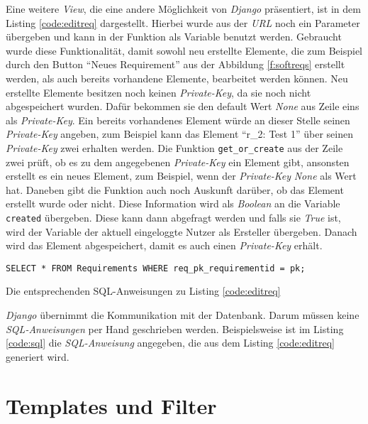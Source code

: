 \documentclass[11pt,a4paper]{report}
\begin{document}
Eine weitere \textit{View}, die eine andere Möglichkeit von \textit{Django} präsentiert, ist in dem Listing \ref{code:editreq} dargestellt. Hierbei wurde aus der \textit{URL} noch ein Parameter übergeben und kann in der Funktion als Variable benutzt werden. Gebraucht wurde diese Funktionalität, damit sowohl neu erstellte Elemente, die zum Beispiel durch den Button "`Neues Requirement"' aus der Abbildung \ref{f:softreqs} erstellt werden, als auch bereits vorhandene Elemente, bearbeitet werden können. Neu erstellte Elemente besitzen noch keinen \textit{Private-Key}, da sie noch nicht abgespeichert wurden. Dafür bekommen sie den default Wert \textit{None} aus Zeile eins als \textit{Private-Key}. Ein bereits vorhandenes Element würde an dieser Stelle seinen \textit{Private-Key} angeben, zum Beispiel kann das Element "`r\_2: Test 1"' über seinen \textit{Private-Key} zwei erhalten werden. Die Funktion \verb|get_or_create| aus der Zeile zwei prüft, ob es zu dem angegebenen \textit{Private-Key} ein Element gibt, ansonsten erstellt es ein neues Element, zum Beispiel, wenn der \textit{Private-Key} \textit{None} als Wert hat. Daneben gibt die Funktion auch noch Auskunft darüber, ob das Element erstellt wurde oder nicht. Diese Information wird als \textit{Boolean} an die Variable \verb|created| übergeben. Diese kann dann abgefragt werden und falls sie \textit{True} ist, wird der Variable der aktuell eingeloggte Nutzer als Ersteller übergeben. Danach wird das Element abgespeichert, damit es auch einen \textit{Private-Key} erhält.



\begin{listing}[htbp]
\begin{lstlisting}
SELECT * FROM Requirements WHERE req_pk_requirementid = pk;
\end{lstlisting}
\caption{Die entsprechenden SQL-Anweisungen zu Listing \ref{code:editreq}}
\label{code:sql}
\end{listing}

\textit{Django} übernimmt die Kommunikation mit der Datenbank. Darum müssen keine \textit{SQL-Anweisungen} per Hand geschrieben werden. Beispielsweise ist im Listing \ref{code:sql} die \textit{SQL-Anweisung} angegeben, die aus dem Listing \ref{code:editreq} generiert wird.










\section{Templates und Filter}
\label{s:itemp}
\end{document}

